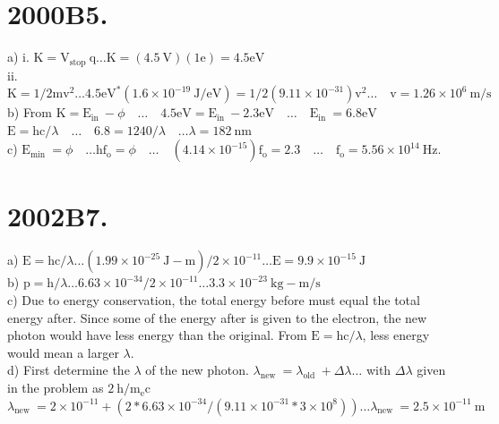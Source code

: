 \begin{enumerate}
\section*{2000B5.}
a) i. $\mathrm{K}=\mathrm{V}_{\text {stop }} \mathrm{q} \ldots \mathrm{K}=(4.5 \mathrm{~V})(1 \mathrm{e})=4.5 \mathrm{eV}$\\
ii. $\mathrm{K}=1 / 2 \mathrm{mv}^{2} \ldots 4.5 \mathrm{eV}^{*}\left(1.6 \times 10^{-19} \mathrm{~J} / \mathrm{eV}\right)=1 / 2\left(9.11 \times 10^{-31}\right) \mathrm{v}^{2} \ldots \quad \mathrm{v}=1.26 \times 10^{6} \mathrm{~m} / \mathrm{s}$\\
b) From $\mathrm{K}=\mathrm{E}_{\text {in }}-\phi \quad \ldots \quad 4.5 \mathrm{eV}=\mathrm{E}_{\text {in }}-2.3 \mathrm{eV} \quad \ldots \quad \mathrm{E}_{\text {in }}=6.8 \mathrm{eV}$\\
$\mathrm{E}=\mathrm{hc} / \lambda \quad \ldots \quad 6.8=1240 / \lambda \quad \ldots \lambda=182 \mathrm{~nm}$\\
c) $\mathrm{E}_{\text {min }}=\phi \quad \ldots \mathrm{hf}_{\mathrm{o}}=\phi \quad \ldots \quad\left(4.14 \times 10^{-15}\right) \mathrm{f}_{\mathrm{o}}=2.3 \quad \ldots \quad \mathrm{f}_{\mathrm{o}}=5.56 \times 10^{14} \mathrm{~Hz}$.

\section*{2002B7.}
a) $\mathrm{E}=\mathrm{hc} / \lambda \ldots\left(1.99 \times 10^{-25} \mathrm{~J}-\mathrm{m}\right) / 2 \times 10^{-11} \ldots \mathrm{E}=9.9 \times 10^{-15} \mathrm{~J}$\\
b) $\mathrm{p}=\mathrm{h} / \lambda \ldots 6.63 \times 10^{-34} / 2 \times 10^{-11} \ldots 3.3 \times 10^{-23} \mathrm{~kg}-\mathrm{m} / \mathrm{s}$\\
c) Due to energy conservation, the total energy before must equal the total energy after. Since some of the energy after is given to the electron, the new photon would have less energy than the original. From $\mathrm{E}=\mathrm{hc} / \lambda$, less energy would mean a larger $\lambda$.\\
d) First determine the $\lambda$ of the new photon. $\lambda_{\text {new }}=\lambda_{\text {old }}+\Delta \lambda \ldots$ with $\Delta \lambda$ given in the problem as $2 \mathrm{~h} / \mathrm{m}_{\mathrm{e}} \mathrm{c}$ $\lambda_{\text {new }}=2 \times 10^{-11}+\left(2 * 6.63 \times 10^{-34} /\left(9.11 \times 10^{-31} * 3 \times 10^{8}\right)\right) \ldots \lambda_{\text {new }}=2.5 \times 10^{-11} \mathrm{~m}$


\end{enumerate}

